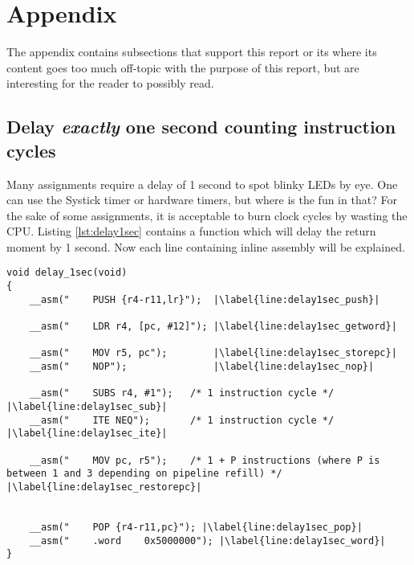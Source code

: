 \section{Appendix}

The appendix contains subsections that support this report or its where its content goes too much off-topic with the purpose of 
this report, but are interesting for the reader to possibly read.

\subsection{Delay \textit{exactly} one second counting instruction cycles}

Many assignments require a delay of 1 second to spot blinky LEDs by eye.
One can use the Systick timer or hardware timers, but where is the fun in that?
For the sake of some assignments, it is acceptable to burn clock cycles by wasting the CPU.
Listing \ref{lst:delay1sec} contains a function which will delay the return moment by 1 second.
Now each line containing inline assembly will be explained.

\begin{lstlisting}[style=CStyle, caption={C function containing inline assembly to perform a delay of \textit{exactly} one second}, captionpos=b, label={lst:delay1sec}, escapechar=|]
void delay_1sec(void)
{
    __asm("    PUSH {r4-r11,lr}");  |\label{line:delay1sec_push}|
 
    __asm("    LDR r4, [pc, #12]"); |\label{line:delay1sec_getword}|
   
    __asm("    MOV r5, pc");        |\label{line:delay1sec_storepc}|
    __asm("    NOP");               |\label{line:delay1sec_nop}|
     
    __asm("    SUBS r4, #1");   /* 1 instruction cycle */ |\label{line:delay1sec_sub}|
    __asm("    ITE NEQ");       /* 1 instruction cycle */ |\label{line:delay1sec_ite}|
   
    __asm("    MOV pc, r5");    /* 1 + P instructions (where P is between 1 and 3 depending on pipeline refill) */ |\label{line:delay1sec_restorepc}|
     
     
    __asm("    POP {r4-r11,pc}"); |\label{line:delay1sec_pop}|
    __asm("    .word    0x5000000"); |\label{line:delay1sec_word}|
}
\end{lstlisting}

